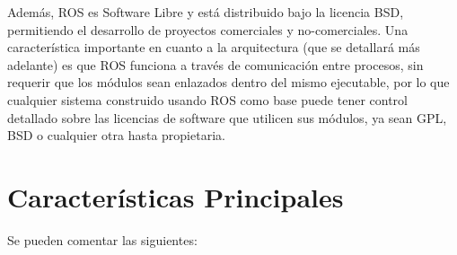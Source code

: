 Además, ROS es Software Libre y está distribuido bajo la licencia BSD, permitiendo el desarrollo de proyectos comerciales y no-comerciales. Una característica importante en cuanto a la arquitectura (que se detallará más adelante) es que ROS funciona a través de comunicación entre procesos, sin requerir que los módulos sean enlazados dentro del mismo ejecutable, por lo que cualquier sistema construido usando ROS como base puede tener control detallado sobre las licencias de software que utilicen sus módulos, ya sean GPL, BSD o cualquier otra hasta propietaria. \cite{quigley2009ros}

\section{Características Principales}

Se pueden comentar las siguientes:

